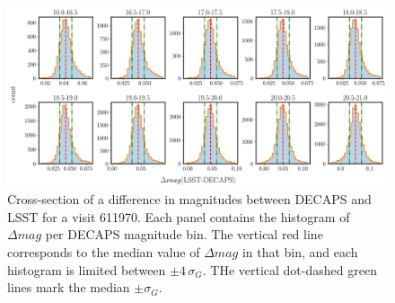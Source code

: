 \documentclass[DM,lsstdraft,toc,usenatbib]{lsstdoc}
\begin{document}
\begin{figure}
\begin{centering}
\includegraphics[width=1.1\columnwidth]{figs/rms_decaps_lsst_611970hist_panel.png}
\caption{Cross-section of a difference in magnitudes between DECAPS and LSST for a visit 611970. Each panel contains the histogram of $\Delta mag$ per DECAPS magnitude bin. The vertical red line corresponds to the median value of $\Delta mag$ in that bin, and each histogram is limited between $\pm 4 \, \sigma_{G}$. THe vertical dot-dashed green lines mark the median $\pm \sigma_{G}$. }
\label{fig:dmag_hist}
\end{centering}
\end{figure} 
\end{document}
